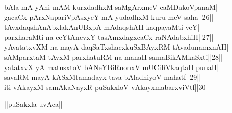 \documentclass{article}
\begin{document}
bAla mA yAhi mAM kurxdadhxM saMgArxmeV caMDakoVpanaM|\\
gacaCx pArxNapariVpAsxyeY mA yudadhxM kuru meV saha||26||\\
tAvxdaqshAnAbxlakAnUBxpA mAdaqshAH kaqpayaMti veY|\\
parxharaMti na ceYtAnevxY tasAmxdagxcaCx raNAdabxhiH||27||\\
yAvatatxvXM na mayA daqSaTxshacxkuSxBAyxRM tAvadunamxnAH|\\
sAMparxtaM tAvxM parxhatuRM na manaH samaBikAMkaSxti||28||\\
yatatxvX yA matusxtoV bANeYBiRnonxV mUCiRVkaqtaH punaH|\\
savaRM mayA kASxMtamadayx tava bAladhiyoV mahatf||29||\\
iti vAkayxM samAkaNayxR puSakxloV vAkayxmabarxviVtf||30||\\

\begin{center}
||puSakxla uvAca||
\end{center}
\end{document}
